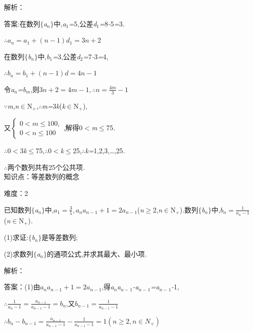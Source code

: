 \documentclass{article} %
\begin{document}
解析：

 答案:在数列$\mathrm{\{}$\textit{a${}_{n}$}$\mathrm{\}}$中,\textit{a}${}_{1}$\textit{=}5,公差\textit{d}${}_{1}$\textit{=}8\textit{-}5\textit{=}3\textit{.}

$\therefore a_n = a_1+(n-1)d_1=3n+2$

在数列$\mathrm{\{}$\textit{b${}_{n}$}$\mathrm{\}}$中,\textit{b}${}_{1}$\textit{=}3,公差\textit{d}${}_{2}$\textit{=}7\textit{-}3\textit{=}4,

$\therefore b_n = b_1+(n-1)d=4n-1$

令\textit{a${}_{n}$=b${}_{m}$},则$3n+2=4m-1,\therefore n=\frac{4m}{3}-1$

\textit{$\because$m},\textit{n}$\mathrm{\in}$N\textit{${}_{+}$},\textit{$\therefore$m=}3\textit{k}(\textit{k}$\mathrm{\in}$N\textit{${}_{+}$}),

又$\left\{
\begin{array}{l}
0<m\le 100, \\
0<n\le 100
\end{array}
\right.$,解得0\textit{$<$m}$\mathrm{\le}$75\textit{.}

\textit{$\therefore$}0\textit{$<$}3\textit{k}$\mathrm{\le}$75,\textit{$\therefore$}0\textit{$<$k}$\mathrm{\le}$25,\textit{$\therefore$k=}1,2,3,{\dots},25\textit{.}

\textit{$\therefore$}两个数列共有25个公共项\textit{.} \\

知识点：等差数列的概念

难度：2

 已知数列$\mathrm{\{}$\textit{a${}_{n}$}$\mathrm{\}}$中,$a_1 = \frac{3}{5},a_na_{n-1}+1=2a_{n-1}$(\textit{n}$\mathrm{\ge}$2,\textit{n}$\mathrm{\in}$N\textit{${}_{+}$})\textit{.}数列$\mathrm{\{}$\textit{b${}_{n}$}$\mathrm{\}}$中,$b_n=\frac{1}{a_{n}-1}$(\textit{n}$\mathrm{\in}$N\textit{${}_{+}$})\textit{.}

 (1)求证:$\mathrm{\{}$\textit{b${}_{n}$}$\mathrm{\}}$是等差数列;

 (2)求数列$\mathrm{\{}$\textit{a${}_{n}$}$\mathrm{\}}$的通项公式,并求其最大、最小项\textit{.}

解析：

 答案：(1)由$a_na_{n-1}+1=2a_{n-1}$,得\textit{a${}_{n}$a${}_{n-}$}${}_{1}$\textit{-a${}_{n-}$}${}_{1}$\textit{=a${}_{n-}$}${}_{1}$\textit{-}1,

$\therefore \frac{1}{a_n-1}=\frac{a_{n-1}}{a_{n-1}-1}=b_n$,又$b_{n-1}=\frac{1}{a_{n-1}-1}$

$\therefore b_n-b_{n-1}=\frac{a_{n-1}}{a_{n-1}-1}-\frac{1}{a_{n-1}-1}=1(n\ge 2,n\in N_{+})$
\end{document}
